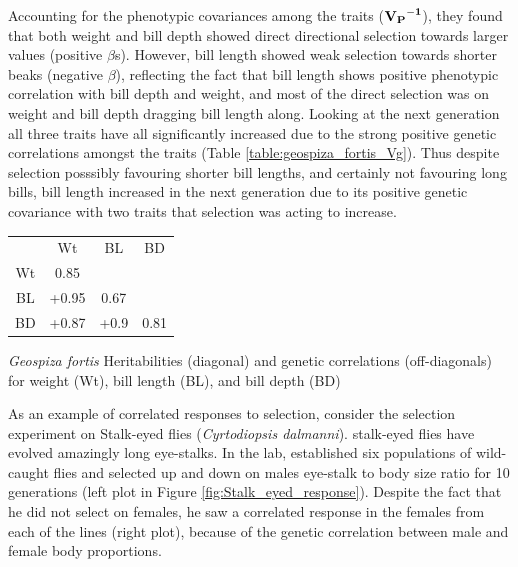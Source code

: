  
 Accounting for the phenotypic covariances among the traits ($\bf{V_P}^{-1}$), they found that both
 weight and bill depth showed direct directional selection towards larger
 values (positive $\beta$s). However, bill length showed weak
 selection towards shorter beaks (negative $\beta$), reflecting the fact that bill length shows positive phenotypic correlation with
 bill depth and weight, and most of the direct selection was on weight
 and bill depth dragging bill length along. Looking at the next
 generation all three traits have all significantly increased due to
 the strong positive genetic correlations amongst the traits (Table \ref{table:geospiza_fortis_Vg}). Thus
 despite selection posssibly favouring shorter bill lengths, and
 certainly not favouring long bills, bill length increased in the next 
 generation due to its positive genetic covariance with two traits
 that selection was acting to increase. 

 \begin{margintable}
   \begin{tabular}{cccc}\\
      & Wt         & BL & BD \\     
    Wt &  0.85  &    &         \\
     BL &  +0.95  & 0.67    &  \\ 
     BD &  +0.87 &  +0.9         &  0.81  
  \end{tabular}
 \caption{{\it Geospiza fortis} Heritabilities (diagonal) and genetic
   correlations (off-diagonals)  for weight (Wt), bill length (BL),
   and bill depth (BD)  \citep[numbers from][]{boag1983heritability}} \label{table:geospiza_fortis_Vg}
\end{margintable}    


As an example of correlated responses to selection, consider the  \citet{wilkinson:93} selection experiment on Stalk-eyed
 flies ({\it Cyrtodiopsis  dalmanni}). stalk-eyed flies have evolved amazingly long eye-stalks. In the lab, \citeauthor{wilkinson:93} established six populations of
 wild-caught flies and selected up and down on males eye-stalk to body
 size ratio for 10 generations (left plot in Figure
 \ref{fig:Stalk_eyed_response}). Despite the fact that he did not
 select on females, he saw a correlated response in the females from
 each of the lines (right plot), because of the genetic correlation
 between male and female body proportions. 

